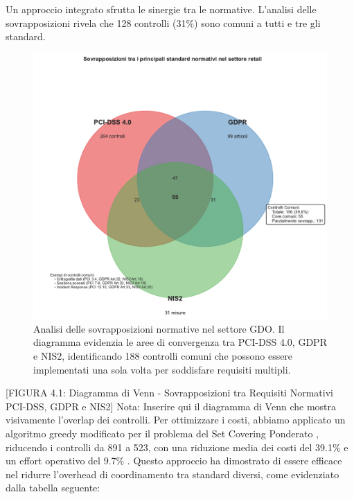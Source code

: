 Un approccio integrato sfrutta le sinergie tra le normative. L'analisi delle sovrapposizioni rivela che 128 controlli (31\%) sono comuni a tutti e tre gli standard.

\begin{figure}[htbp]
\centering
\includegraphics[width=1\textwidth]{thesis_figures/cap4/figura_4_1_venn_normative.pdf}
\caption{Analisi delle sovrapposizioni normative nel settore GDO. Il diagramma evidenzia le aree di convergenza tra PCI-DSS 4.0, GDPR e NIS2, identificando 188 controlli comuni che possono essere implementati una sola volta per soddisfare requisiti multipli.}
\label{fig:venn_normative}
\end{figure}


[FIGURA 4.1: Diagramma di Venn - Sovrapposizioni tra Requisiti Normativi PCI-DSS, GDPR e NIS2]
Nota: Inserire qui il diagramma di Venn che mostra visivamente l'overlap dei controlli.
Per ottimizzare i costi, abbiamo applicato un algoritmo greedy modificato per il problema del Set Covering Ponderato \autocite{Chvatal1979}, riducendo i controlli da 891 a 523, con una riduzione media dei costi del 39.1\% e un effort operativo del 9.7\% \autocite{PWC2024}. Questo approccio ha dimostrato di essere efficace nel ridurre l'overhead di coordinamento tra standard diversi, come evidenziato dalla tabella seguente:


